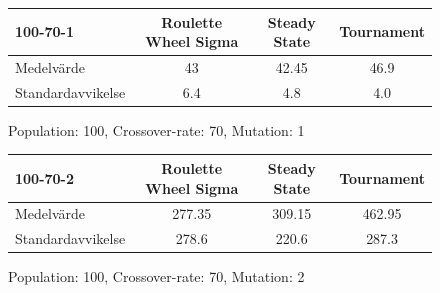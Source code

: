 \documentclass[titlepage, a4paper, 12pt]{article}
\begin{document}
\begin{figure}[H]
\begin{tabular}{lccc}
\hline
100-70-1 & Roulette Wheel Sigma & Steady State & Tournament \\
\hline
Medelvärde & 43 & 42.45 & 46.9 \\
Standardavvikelse & 6.4 & 4.8 & 4.0 \\
\hline
\end{tabular}
\caption{Population: 100, Crossover-rate: 70, Mutation: 1}\label{tab:mut1}
\end{figure}

\begin{figure}[H]
\begin{tabular}{lccc}
\hline
100-70-2 & Roulette Wheel Sigma & Steady State & Tournament \\
\hline
Medelvärde & 277.35 & 309.15 & 462.95 \\
Standardavvikelse & 278.6 & 220.6 & 287.3 \\
\hline
\end{tabular}
\caption{Population: 100, Crossover-rate: 70, Mutation: 2}\label{tab:mut2}
\end{figure}

\end{document}
